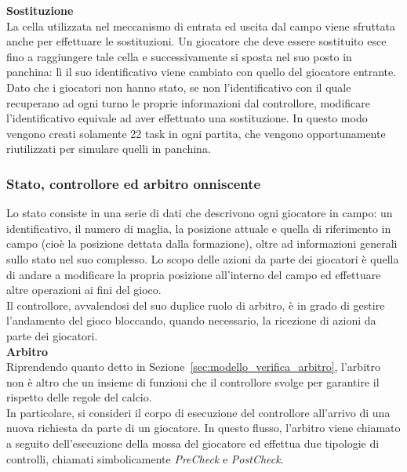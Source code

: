 \textbf{Sostituzione}\\

La cella utilizzata nel meccanismo di entrata ed uscita dal campo viene sfruttata anche per effettuare le sostituzioni. Un giocatore che deve essere sostituito esce fino a raggiungere tale cella e successivamente si sposta nel suo posto in panchina: lì il suo identificativo viene cambiato con quello del giocatore entrante. Dato che i giocatori non hanno stato, se non l'identificativo con il quale recuperano ad ogni turno le proprie informazioni dal controllore, modificare l'identificativo equivale ad aver effettuato una sostituzione. In questo modo vengono creati solamente 22 task in ogni partita, che vengono opportunamente riutilizzati per simulare quelli in panchina.\\

\subsubsection{Stato, controllore ed arbitro onniscente}
\label{sec:analisi_concorrenza_controllore_arbitro}

Lo stato consiste in una serie di dati che descrivono ogni giocatore in campo: un identificativo, il numero di maglia, la posizione attuale e quella di riferimento in campo (cioè la posizione dettata dalla formazione), oltre ad informazioni generali sullo stato nel suo complesso. Lo scopo delle azioni da parte dei giocatori è quella di andare a modificare la propria posizione all'interno del campo ed effettuare altre operazioni ai fini del gioco.\\

Il controllore, avvalendosi del suo duplice ruolo di arbitro, è in grado di gestire l'andamento del gioco bloccando, quando necessario, la ricezione di azioni da parte dei giocatori.\\

\textbf{Arbitro}\\

Riprendendo quanto detto in Sezione~\ref{sec:modello_verifica_arbitro}, l'arbitro non è altro che un insieme di funzioni che il controllore svolge per garantire il rispetto delle regole del calcio.\\

In particolare, si consideri il corpo di esecuzione del controllore all'arrivo di una nuova richiesta da parte di un giocatore. In questo flusso, l'arbitro viene chiamato a seguito dell'esecuzione della mossa del giocatore ed effettua due tipologie di controlli, chiamati simbolicamente \emph{PreCheck} e \emph{PostCheck}.\\


